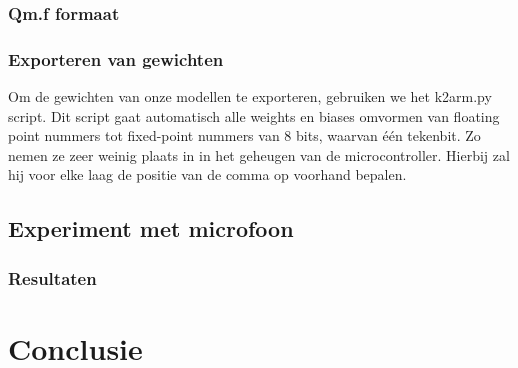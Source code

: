 \subsubsection{Qm.f formaat}
\label{section:Qm.f}

\subsubsection{Exporteren van gewichten}
Om de gewichten van onze modellen te exporteren, gebruiken we het k2arm.py script. Dit script gaat automatisch alle weights en biases omvormen van floating point nummers tot fixed-point nummers van 8 bits, waarvan één tekenbit. Zo nemen ze zeer weinig plaats in in het geheugen van de microcontroller. Hierbij zal hij voor elke laag de positie van de comma op voorhand bepalen.

\subsection{Experiment met microfoon}
\subsubsection{Resultaten}


\section{Conclusie}